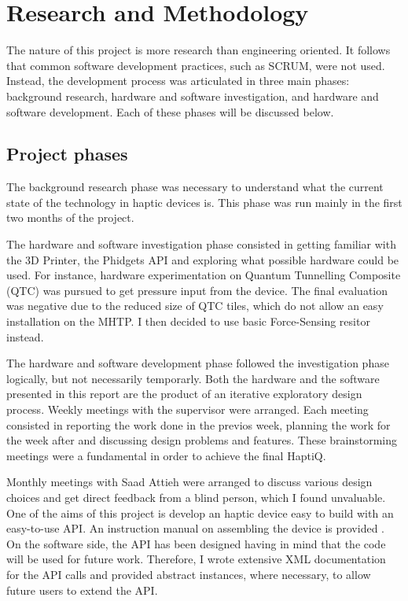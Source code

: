 \chapter{Research and Methodology}

The nature of this project is more research than engineering oriented. It follows that common software development practices, such as SCRUM, were not used. Instead, the development process was articulated in three main phases: background research, hardware and software investigation, and hardware and software development. Each of these phases will be discussed below. 

\section{Project phases}
The background research phase was necessary to understand what the current state of the technology in haptic devices is. This phase was run mainly in the first two months of the project. 

The hardware and software investigation phase consisted in getting familiar with the 3D Printer, the Phidgets API and exploring what possible hardware could be used. For instance, hardware experimentation on Quantum Tunnelling Composite (QTC) was pursued to get pressure input from the device. The final evaluation was negative due to the reduced size of QTC tiles, which do not allow an easy installation on the MHTP. I then decided to use basic Force-Sensing resitor instead. 

The hardware and software development phase followed the investigation phase logically, but not necessarily temporarly. Both the hardware and the software presented in this report are the product of an iterative exploratory design process. Weekly meetings with the supervisor were arranged. Each meeting consisted in reporting the work done in the previos week, planning the work for the week after and discussing design problems and features. These brainstorming meetings were a fundamental in order to achieve the final HaptiQ.

Monthly meetings with Saad Attieh were arranged to discuss various design choices and get direct feedback from a blind person, which I found unvaluable. 
One of the aims of this project is develop an haptic device easy to build with an easy-to-use API. An instruction manual on assembling the device is provided . On the software side, the API has been designed having in mind that the code will be used for future work. Therefore, I wrote extensive XML documentation for the API calls and provided abstract instances, where necessary, to allow future users to extend the API. 

